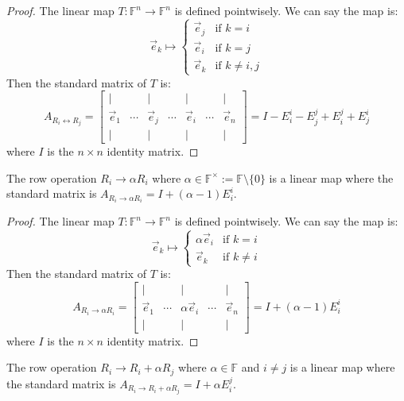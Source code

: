 \documentclass[
	11pt, %
	fleqn, %
	a4paper, %
]{LegrandOrangeBook}
\newcommand{\F}{\mathbb{F}} %
\begin{document}
\begin{proof}
    The linear map $T: \F^n \to \F^n$ is defined pointwisely. We can say the map is:
    \[
        \vec{e}_k \mapsto \begin{cases}
            \vec{e}_j & \text{if } k = i \\
            \vec{e}_i & \text{if } k = j \\
            \vec{e}_k & \text{if } k \neq i, j
        \end{cases}
    \]
    Then the standard matrix of $T$ is:
    \[
        A_{R_i \leftrightarrow R_j} = \begin{bmatrix}
            | & & | & & | & & | \\
            \vec{e}_1 & \cdots & \vec{e}_j & \cdots & \vec{e}_i & \cdots & \vec{e}_n \\
            | & & | & & | & & | 
        \end{bmatrix} = I - E_i^i - E_j^j + E_i^j + E_j^i
    \]
    where $I$ is the $n \times n$ identity matrix.
\end{proof}

\begin{proposition}
    The row operation $R_i \to \alpha R_i$ where $\alpha \in \F^{\times} := \F \setminus \{0\}$ is a linear map where the standard matrix is $A_{R_i \to \alpha R_i} = I + (\alpha - 1) E_i^i$.
\end{proposition}

\begin{proof}
    The linear map $T: \F^n \to \F^n$ is defined pointwisely. We can say the map is:
    \[
        \vec{e}_k \mapsto \begin{cases}
            \alpha \vec{e}_i & \text{if } k = i \\
            \vec{e}_k & \text{if } k \neq i
        \end{cases}
    \]
    Then the standard matrix of $T$ is:
    \[
        A_{R_i \to \alpha R_i} = \begin{bmatrix}
            | & & | & & | \\
            \vec{e}_1 & \cdots & \alpha\vec{e}_i & \cdots & \vec{e}_n \\
            | & & | & & |
        \end{bmatrix} = I + (\alpha - 1) E_i^i
    \]
    where $I$ is the $n \times n$ identity matrix.
\end{proof}

\begin{proposition}
    The row operation $R_i \to R_i + \alpha R_j$ where $\alpha \in \F$ and $i \neq j$ is a linear map where the standard matrix is $A_{R_i \to R_i + \alpha R_j} = I + \alpha E_i^j$.
\end{proposition}
\end{document}
